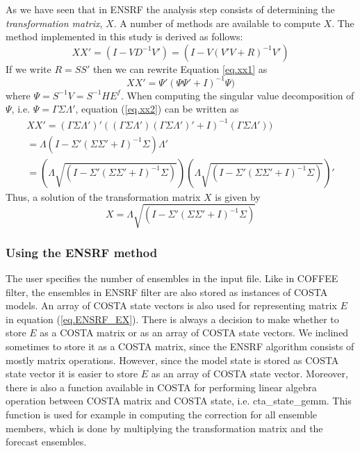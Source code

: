 \documentclass[a4paper,12pt]{article}
\begin{document}
       As we have seen that in ENSRF the analysis step consists of determining the \emph{transformation matrix}, $X$. A number of methods are available to compute $X$. The method implemented in this study is derived as follows:
       \begin{equation}
       \label{eq.xx1}
          X X'=(I-V D^{-1} V') = (I-V (V' V + R)^{-1} V')
       \end{equation}
       If we write $R=SS'$ then we can rewrite Equation \ref{eq.xx1} as
       \begin{equation}
       \label{eq.xx2}
          X X'= \Psi' (\Psi \Psi' + I)^{-1} \Psi)
       \end{equation}
       where $\Psi=S^{-1}V=S^{-1}HE^f$. When computing the singular value decomposition of $\Psi$, i.e. $\Psi=\Gamma \Sigma \Lambda'$, equation (\ref{eq.xx2}) can be written as
       \begin{eqnarray}
          X X'= (\Gamma \Sigma \Lambda')' ((\Gamma \Sigma \Lambda') (\Gamma \Sigma \Lambda')' + I)^{-1} (\Gamma \Sigma \Lambda')) \\
          = \Lambda (I-\Sigma' (\Sigma \Sigma'+I)^{-1} \Sigma) \Lambda' \\
          = (\Lambda \sqrt{(I-\Sigma' (\Sigma \Sigma'+I)^{-1} \Sigma)})(\Lambda \sqrt{(I-\Sigma' (\Sigma \Sigma'+I)^{-1} \Sigma)})'
       \end{eqnarray}
       Thus, a solution of the transformation matrix $X$ is given by
       \begin{equation}
           X = \Lambda \sqrt{(I-\Sigma' (\Sigma \Sigma'+I)^{-1} \Sigma)}
       \end{equation}
%           



\subsubsection{Using the ENSRF method}

         The user specifies the number of ensembles in the input file. Like in
         COFFEE filter, the ensembles in ENSRF filter are also stored as
         instances of COSTA models. An array of COSTA state vectors is also
         used for representing matrix $E$ in equation (\ref{eq.ENSRF_EX}).
         There is always a decision to make whether to store $E$ as a COSTA
         matrix or as an array of COSTA state vectors. We inclined sometimes to
         store it as a COSTA matrix, since the ENSRF algorithm consists of
         mostly matrix operations. However, since the model state is stored as
         COSTA state vector it is easier to store $E$ as an array of COSTA
         state vector. Moreover, there is also a function available in COSTA
         for performing linear algebra operation between COSTA matrix and COSTA
         state, i.e. cta\_state\_gemm. This function is used for example in
         computing the correction for all ensemble members, which is done by
         multiplying the transformation matrix and the forecast ensembles.
\end{document}
